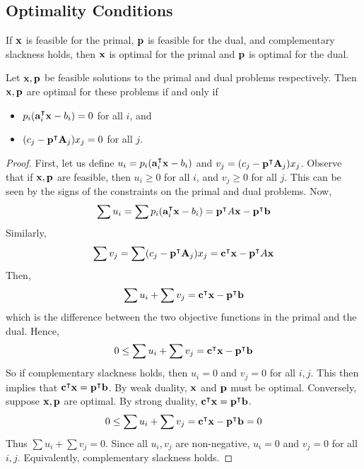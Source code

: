 \subsection{Optimality Conditions}
If \( \vb x \) is feasible for the primal, \( \vb p \) is feasible for the dual, and complementary slackness holds, then \( \vb x \) is optimal for the primal and \( \vb p \) is optimal for the dual.
\begin{theorem}
    Let \( \vb x, \vb p \) be feasible solutions to the primal and dual problems respectively. Then \( \vb x, \vb p \) are optimal for these problems if and only if
    \begin{itemize}
        \item \( p_i (\vb a_i^\intercal \vb x - b_i) = 0 \) for all \( i \), and
        \item  \( (c_j - \vb p^\intercal \vb A_j) x_j = 0 \) for all \( j \).
    \end{itemize}
\end{theorem}
\begin{proof}
    First, let us define \( u_i = p_i (\vb a_i^\intercal \vb x - b_i ) \) and \( v_j = (c_j - \vb p^\intercal \vb A_j) x_j \).
    Observe that if \( \vb x, \vb p \) are feasible, then \( u_i \geq 0 \) for all \( i \), and \( v_j \geq 0 \) for all \( j \).
    This can be seen by the signs of the constraints on the primal and dual problems.
    Now,
    \[ \sum u_i = \sum p_i (\vb a_i^\intercal \vb x - b_i ) = \vb p^\intercal A \vb x - \vb p^\intercal \vb b \]
    Similarly,
    \[ \sum v_j = \sum (c_j - \vb p^\intercal \vb A_j) x_j = \vb c^\intercal \vb x - \vb p^\intercal A \vb x \]
    Then,
    \[ \sum u_i + \sum v_j = \vb c^\intercal \vb x - \vb p^\intercal \vb b \]
    which is the difference between the two objective functions in the primal and the dual.
    Hence,
    \[ 0 \leq \sum u_i + \sum v_j = \vb c^\intercal \vb x - \vb p^\intercal \vb b \]
    So if complementary slackness holds, then \( u_i = 0 \) and \( v_j = 0 \) for all \( i, j \).
    This then implies that \( \vb c^\intercal \vb x = \vb p^\intercal \vb b \).
    By weak duality, \( \vb x \) and \( \vb p \) must be optimal.
    Conversely, suppose \( \vb x, \vb p \) are optimal.
    By strong duality, \( \vb c^\intercal \vb x = \vb p^\intercal \vb b \).
    \[ 0 \leq \sum u_i + \sum v_j = \vb c^\intercal \vb x - \vb p^\intercal \vb b = 0 \]
    Thus \( \sum u_i + \sum v_j = 0 \).
    Since all \( u_i, v_j \) are non-negative, \( u_i = 0 \) and \( v_j = 0 \) for all \( i, j \).
    Equivalently, complementary slackness holds.
\end{proof}

